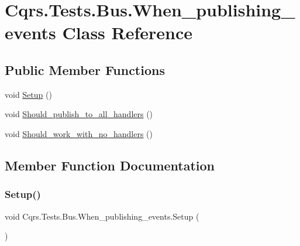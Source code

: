 \hypertarget{classCqrs_1_1Tests_1_1Bus_1_1When__publishing__events}{}\section{Cqrs.\+Tests.\+Bus.\+When\+\_\+publishing\+\_\+events Class Reference}
\label{classCqrs_1_1Tests_1_1Bus_1_1When__publishing__events}
\subsection*{Public Member Functions}
\begin{DoxyCompactItemize}
\item 
void \hyperlink{classCqrs_1_1Tests_1_1Bus_1_1When__publishing__events_addb2aa584a2bfe5c309e23bea1294fd8_addb2aa584a2bfe5c309e23bea1294fd8}{Setup} ()
\item 
void \hyperlink{classCqrs_1_1Tests_1_1Bus_1_1When__publishing__events_a61de6fab7f7e2c3b972dba53308ec8ef_a61de6fab7f7e2c3b972dba53308ec8ef}{Should\+\_\+publish\+\_\+to\+\_\+all\+\_\+handlers} ()
\item 
void \hyperlink{classCqrs_1_1Tests_1_1Bus_1_1When__publishing__events_afc4e77f96cbb5529db243acfb6eed3ba_afc4e77f96cbb5529db243acfb6eed3ba}{Should\+\_\+work\+\_\+with\+\_\+no\+\_\+handlers} ()
\end{DoxyCompactItemize}


\subsection{Member Function Documentation}
\mbox{\label{classCqrs_1_1Tests_1_1Bus_1_1When__publishing__events_addb2aa584a2bfe5c309e23bea1294fd8_addb2aa584a2bfe5c309e23bea1294fd8}} 
\subsubsection{\texorpdfstring{Setup()}{Setup()}}
{\footnotesize\ttfamily void Cqrs.\+Tests.\+Bus.\+When\+\_\+publishing\+\_\+events.\+Setup (\begin{DoxyParamCaption}{ }\end{DoxyParamCaption})}

